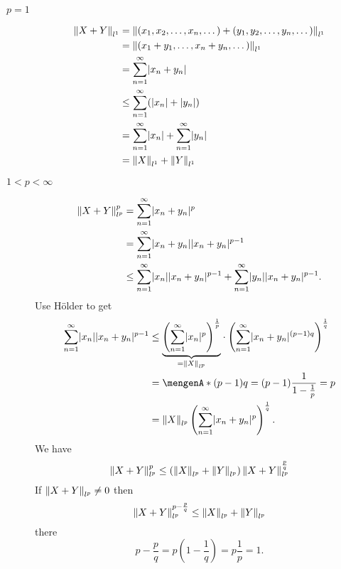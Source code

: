 \begin{beweis}
	\begin{description}
		\item[$p=1$] 
		\begin{align*}
			\norm{X+Y}_{l^1} &= \norm{(x_1,x_2, \dots,x_n, \dots)+ (y_1,y_2, \dots,y_n, \dots)}_{l^1} \\
			&= \norm{(x_1+y_1, \dots,x_n + y_n, \dots)}_{l^1} \\
			&= \sum_{n=1}^{\infty} \abs{x_n+y_n} \\
			&\leq \sum_{n=1}^{\infty} (\abs{x_n}+\abs{y_n}) \\
			&= \sum_{n=1}^{\infty}\abs{x_n}+ \sum_{n=1}^{\infty}\abs{y_n} \\
			&= \norm{X}_{l^1}+ \norm{Y}_{l^1}
		\end{align*} 
		\item[$1 < p < \infty$] 
		\begin{align*}
					\norm{X+Y}_{l^p}^p &= \sum_{n=1}^{\infty}\abs{x_n+y_n}^p \\
					&= \sum_{n=1}^{\infty}\abs{x_n+y_n}\abs{x_n+y_n}^{p-1} \\
					&\leq \sum_{n=1}^{\infty}\abs{x_n}\abs{x_n+y_n}^{p-1} + \sum_{n=1}^{\infty}\abs{y_n}\abs{x_n+y_n}^{p-1}.
		\end{align*}
		Use Hölder to get
		\begin{align*}
			\sum_{n=1}^{\infty}\abs{x_n}\abs{x_n+y_n}^{p-1} &\leq
			 \underset{=\norm{X}_{l^p}}{\underbrace{\left( \sum_{n=1}^{\infty}\abs{x_n}^p \right)^{\frac{1}{p}}}} \cdot \left( \sum_{n=1}^{\infty}\abs{x_n+y_n}^{(p-1)q} \right)^{\frac{1}{q}} \\
			 &= \set{(p-1)q = (p-1)\frac{1}{1-\frac{1}{p}}=p} \\
			 &= \norm{X}_{l^p}  \left( \sum_{n=1}^{\infty}\abs{x_n+y_n}^p \right)^{\frac{1}{q}}.
		\end{align*}
		We have
		\[
			\norm{X+Y}_{l^p}^p \leq \left( \norm{X}_{l^p} + \norm{Y}_{l^p} \right) \norm{X+Y}_{l^p}^{\frac{p}{q}}
		\]
		If $\norm{X+Y}_{l^p} \neq 0$ then
		\[
			\norm{X+Y}_{l^p}^{p-\frac{p}{q}} \leq \norm{X}_{l^p} + \norm{Y}_{l^p}
		\]
		there
		\[
			p- \frac{p}{q} = p (1- \frac{1}{q}) = p \frac{1}{p} = 1.
		\]
	\end{description}
\end{beweis}

